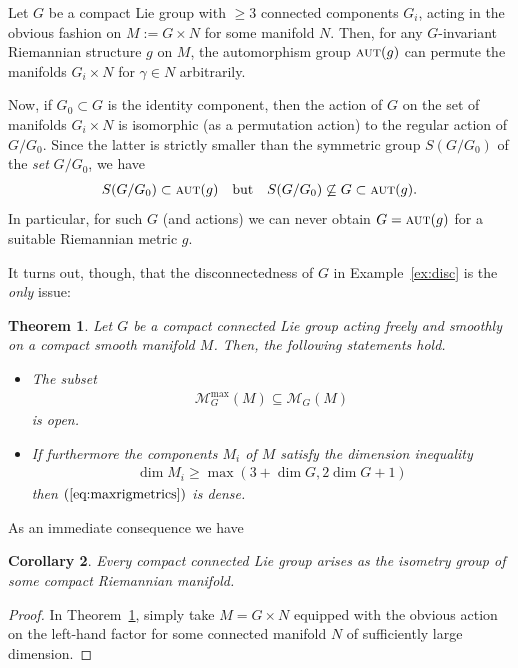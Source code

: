 \documentclass[pdftex]{sigma}%
\numberwithin{equation}{section}
\newtheorem{Theorem}{Theorem}[section]
\newtheorem{Corollary}[Theorem]{Corollary}
\newcommand{\cat}[1]{\textsc{#1}}
\begin{document}
\begin{Example}\label{ex:disc}
 Let $G$ be a compact Lie group with $\ge 3$ connected components $G_i$, acting in the obvious fashion on $M:=G\times N$ for some manifold $N$. Then, for any $G$-invariant Riemannian structure $g$ on $M$, the automorphism group $\cat{aut}(g)$ can permute the manifolds $G_i\times N$ for $\gamma\in N$ arbitrarily.

Now, if $G_0\subset G$ is the identity component, then the action of $G$ on the set of manifolds $G_i\times N$ is isomorphic (as a permutation action) to the regular action of $G/G_0$. Since the latter is strictly smaller than the symmetric group $S(G/G_0)$ of the {\it set} $G/G_0$, we have
 \begin{gather*}
 S(G/G_0)\subset \cat{aut}(g)\quad \text{but}\quad S(G/G_0)\not\subseteq G\subset \cat{aut}(g).
 \end{gather*}
 In particular, for such $G$ (and actions) we can never obtain $G=\cat{aut}(g)$ for a suitable Riemannian metric $g$.
\end{Example}

It turns out, though, that the disconnectedness of $G$ in Example~\ref{ex:disc} is the {\it only} issue:

\begin{Theorem}\label{th:precaut}
 Let $G$ be a compact connected Lie group acting freely and smoothly on a compact smooth manifold $M$. Then, the following statements hold.
 \begin{itemize}\itemsep=0pt
 \item The subset
 \begin{gather}\label{eq:maxrigmetrics}
 \mathcal{M}^{\max}_G(M) \subseteq \mathcal{M}_G(M)
 \end{gather}
 is open.
 \item If furthermore the components $M_i$ of $M$ satisfy the dimension inequality
 \begin{gather}\label{eq:2g}
 \dim M_i\ge \max(3+\dim G,2\dim G+1)
 \end{gather}
 then $(\ref{eq:maxrigmetrics})$ is dense.
 \end{itemize}
\end{Theorem}

As an immediate consequence we have

\begin{Corollary}\label{cor:isiso}
 Every compact connected Lie group arises as the isometry group of some compact Riemannian manifold.
\end{Corollary}
\begin{proof}
 In Theorem~\ref{th:precaut}, simply take $M=G\times N$ equipped with the obvious action on the left-hand factor for some connected manifold $N$ of sufficiently large dimension.
\end{proof}
\end{document}
